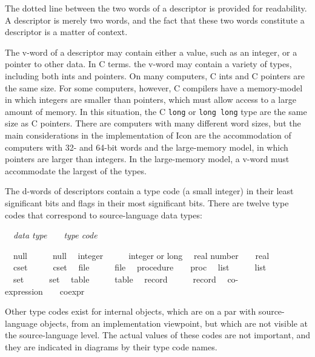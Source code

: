The dotted line between the two words of a descriptor is provided for
readability. A descriptor is merely two words, and the fact that these
two words constitute a descriptor is a matter of context.

The v-word of a descriptor may contain either a value, such as an
integer, or a pointer to other data. In C terms. the v-word may
contain a variety of types, including both ints and pointers. On many
computers, C ints and C pointers are the same size. For some
computers, however, C compilers have a memory-model in which integers
are smaller than pointers, which must allow access to a large amount
of memory. In this situation, the C \texttt{long} or \texttt{long
long} type are the same size as C pointers. There are computers with
many different word sizes, but the main considerations in the
implementation of Icon are the accommodation of computers with 32- and
64-bit words and the large-memory model, in which pointers are larger
than integers. In the large-memory model, a v-word must accommodate
the largest of the types.

The d-words of descriptors contain a type code (a small integer) in
their least significant bits and flags in their most significant
bits. There are twelve type codes that correspond to source-language
data types:

\ \ \textit{data type}\ \ \ \ \textit{type code}


\ \ null\ \ \ \ \ \ null\newline
\ \ integer\ \ \ \ \ \ integer or long\newline
\ \ real number\ \ \ \ real\newline
\ \ cset\ \ \ \ \ \ cset\newline
\ \ file\ \ \ \ \ \ file\newline
\ \ procedure\ \ \ \ proc\newline
\ \ list\ \ \ \ \ \ list\newline
\ \ set\ \ \ \ \ \ set\newline
\ \ table\ \ \ \ \ \ table\newline
\ \ record\ \ \ \ \ \ record\newline
\ \ co-expression\ \ \ \ coexpr


Other type codes exist for internal objects, which are on a par with
source-language objects, from an implementation viewpoint, but which
are not visible at the source-language level. The actual values of
these codes are not important, and they are indicated in diagrams by
their type code names.

